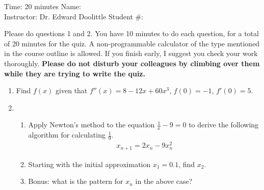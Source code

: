 \documentclass[12pt]{article}
\newcommand{\ds}{\displaystyle}
\begin{document}
\thispagestyle{plain}

\begin{flushleft}
Time:  20 minutes                \hfill       Name: \underline{\hspace{2in}} \\
Instructor: Dr. Edward Doolittle \hfill Student \#: \underline{\hspace{2in}}
\end{flushleft}

\noindent
Please do questions 1 and 2.  You have 10 minutes
to do each question, for a total of 20
minutes for the quiz.  A non-programmable
calculator of the type mentioned in the course outline is allowed.
If you finish early, I suggest you check your work thoroughly.
\textbf{Please do not disturb your colleagues by climbing over them while
they are trying to write the quiz.}

\begin{enumerate}
\item Find 
  $\ds f(x)$ given that $\ds f''(x)=8-12x+60x^3$, $\ds f(0)=-1$, $\ds f'(0)=5$.
\vfill
\newpage
\item 
  \begin{enumerate}
  \item Apply Newton's method to the 
    equation $\ds \frac{1}{x}-9=0$ to derive the following algorithm
    for calculating $\ds \frac{1}{9}$.
    \begin{align*}
      x_{n+1} = 2x_n-9x_n^2
    \end{align*}
\vfill
\vfill
\vfill
\vfill
  \item Starting with the initial approximation $\ds x_1=0.1$, find $\ds x_2$.
\vfill
\vfill
\vfill
  \item Bonus: what is the pattern for $\ds x_n$ in the above case?
\vfill
  \end{enumerate}
\end{enumerate}
\end{document}
